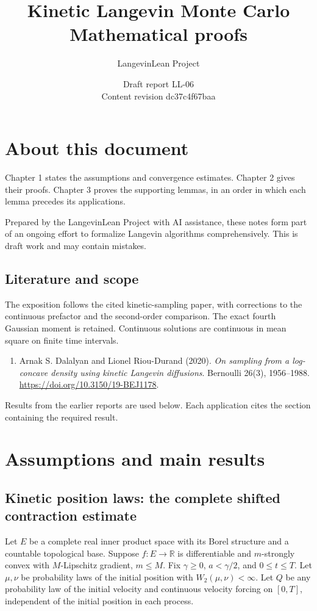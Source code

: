 \documentclass[11pt,a4paper]{report}
\title{\texorpdfstring{Kinetic Langevin Monte Carlo}{Kinetic Langevin Monte Carlo}\\[0.6em]\large Mathematical proofs}
\author{LangevinLean Project}
\date{Draft report LL-06\\[0.4em]\small Content revision dc37c4f67baa}
\begin{document}
\maketitle
\chapter*{About this document}
Chapter 1 states the assumptions and convergence estimates. Chapter 2 gives their proofs. Chapter 3 proves the supporting lemmas, in an order in which each lemma precedes its applications.

Prepared by the LangevinLean Project with AI assistance, these notes form part of an ongoing effort to formalize Langevin algorithms comprehensively. This is draft work and may contain mistakes.

\section*{Literature and scope}
The exposition follows the cited kinetic-sampling paper, with corrections to the continuous prefactor and the second-order comparison. The exact fourth Gaussian moment is retained. Continuous solutions are continuous in mean square on finite time intervals.

\begin{enumerate}
\item Arnak S. Dalalyan and Lionel Riou-Durand (2020). \emph{On sampling from a log-concave density using kinetic Langevin diffusions}. Bernoulli 26(3), 1956–1988. \url{https://doi.org/10.3150/19-BEJ1178}.
\end{enumerate}
Results from the earlier reports \cite{LangevinLean2026ULASC} are used below. Each application cites the section containing the required result.

\tableofcontents
\clearpage
{}
\chapter{Assumptions and main results}
\section{\texorpdfstring{Kinetic position laws: the complete shifted contraction estimate}{Kinetic position laws: the complete shifted contraction estimate}}


Let \(E\) be a complete real inner product space with its Borel
structure and a countable topological base. Suppose \(f:E\to\mathbb R\) is
differentiable and \(m\)-strongly convex with \(M\)-Lipschitz gradient,
\(m\le M\). Fix \(\gamma\ge0\), \(a<\gamma/2\), and \(0\le t\le T\).
Let \(\mu,\nu\) be probability laws of the initial position with
\(W_2(\mu,\nu)<\infty\). Let \(Q\) be any probability law of the initial
velocity and continuous velocity forcing on \([0,T]\), independent of the
initial position in each process.
\end{document}
